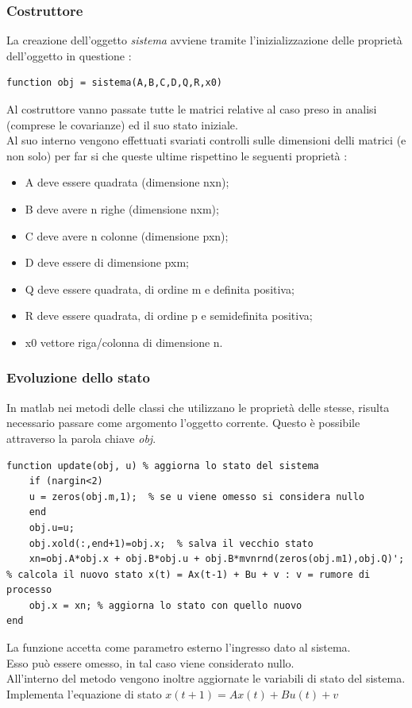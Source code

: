 \subsubsection{Costruttore}
La creazione dell'oggetto \textit{sistema} avviene tramite l'inizializzazione delle proprietà dell'oggetto in questione :
\begin{lstlisting}[frame=single]
function obj = sistema(A,B,C,D,Q,R,x0)
\end{lstlisting}
Al costruttore vanno passate tutte le matrici relative al caso preso in analisi (comprese le covarianze) ed il suo stato iniziale.\\
Al suo interno vengono effettuati svariati controlli sulle dimensioni delli matrici (e non solo) per far si che queste ultime rispettino le seguenti proprietà :
\begin{itemize}
\item A deve essere quadrata (dimensione nxn);
\item B deve avere n righe (dimensione nxm);
\item C deve avere n colonne (dimensione pxn);
\item D deve essere di dimensione pxm;
\item Q deve essere quadrata, di ordine m e definita positiva;
\item R deve essere quadrata, di ordine p e semidefinita positiva;
\item x0 vettore riga/colonna di dimensione n.
\end{itemize}

\subsubsection{Evoluzione dello stato}
In matlab nei metodi delle classi che utilizzano le proprietà delle stesse, risulta necessario passare come argomento l'oggetto corrente. Questo è possibile attraverso la parola chiave \textit{obj}.
\begin{lstlisting}[frame=single]
function update(obj, u) % aggiorna lo stato del sistema 
    if (nargin<2)
	u = zeros(obj.m,1);  % se u viene omesso si considera nullo
    end
    obj.u=u;            
    obj.xold(:,end+1)=obj.x;  % salva il vecchio stato
    xn=obj.A*obj.x + obj.B*obj.u + obj.B*mvnrnd(zeros(obj.m1),obj.Q)'; % calcola il nuovo stato x(t) = Ax(t-1) + Bu + v : v = rumore di processo
    obj.x = xn;	% aggiorna lo stato con quello nuovo            
end
\end{lstlisting}
La funzione accetta come parametro esterno l'ingresso dato al sistema.\\
Esso può essere omesso, in tal caso viene considerato nullo.\\
All'interno del metodo vengono inoltre aggiornate le variabili di stato del sistema.\\
Implementa l'equazione di stato $x(t+1)=Ax(t)+Bu(t)+v$
\newpage
